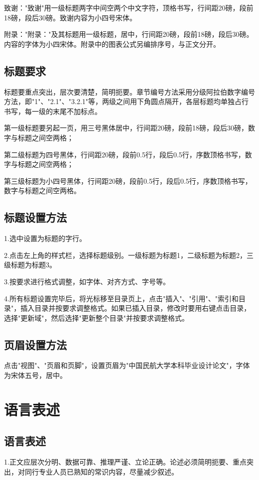 \documentclass[
	StudentName     = 姓名,
	StudentID       = 学号,
	AdvisorName     = 指导教师,
	Grade           = 年级,
	Major           = 专业,
	Department      = 一个很长很长的名字,
	SubmitYear		= 2022,
	SubmitMonth		= 5,
	Title           = 论文中文题目,
	TitleEng        = {{English Title}}
]{cauc_thesis}
\begin{document}
	致谢："致谢"用一级标题两字中间空两个中文字符，顶格书写，行间距20磅，段前18磅，段后30磅。致谢内容为小四号宋体。
	
	附录："附录："及其标题用一级标题，居中，行间距20磅，段前18磅，段后30磅。内容的字体为小四宋体。附录中的图表公式另编排序号，与正文分开。
	
	\subsection{标题要求}
	
	标题要重点突出，层次要清楚，简明扼要。章节编号方法采用分级阿拉伯数字编号方法，即"1"、"2.1"、"3.2.1"等，两级之间用下角圆点隔开，各层标题均单独占行书写，每一级的末尾不加标点。
	
	第一级标题要另起一页，用三号黑体居中，行间距20磅，段前18磅，段后30磅，数字与标题之间空两格；
	
	第二级标题为四号黑体，行间距20磅，段前0.5行，段后0.5行，序数顶格书写，数字与标题之间空两格；
	
	第三级标题为小四号黑体，行间距20磅，段前0.5行，段后0.5行，序数顶格书写，数字与标题之间空两格。
	
	\subsection{标题设置方法}
	
	1.选中设置为标题的字行。
	
	2.点击左上角的样式栏，选择标题级别。一级标题为标题1，二级标题为标题2，三级标题为标题3。
	
	3.按要求进行格式调整，如字体、对齐方式、字号等。
	
	4.所有标题设置完毕后，将光标移至目录页上，点击"插入"、"引用"、"索引和目录"，插入目录并按要求调整格式。如果已插入目录，修改时要用右键点击目录，选择"更新域"，然后选择"更新整个目录"并按要求调整格式。
	
	\subsection{页眉设置方法}
	
	点击"视图"、"页眉和页脚"，设置页眉为"中国民航大学本科毕业设计论文"，字体为宋体五号，居中。
	
	\section{语言表述}
	
	\subsection{语言表述}
	1.正文应层次分明、数据可靠、推理严谨、立论正确。论述必须简明扼要、重点突出，对同行专业人员已熟知的常识内容，尽量减少叙述。
	
\end{document}
